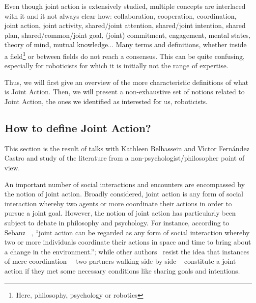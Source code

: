 \documentclass[a4paper,11pt,twoside]{StyleThese}
\begin{document}
Even though joint action is extensively studied, multiple concepts are interlaced with it and it not always clear how: collaboration, cooperation, coordination, joint action, joint activity, shared/joint attention, shared/joint intention, shared plan, shared/common/joint goal, (joint) commitment, engagement, mental states, theory of mind, mutual knowledge... Many terms and definitions, whether inside a field\footnote{Here, philosophy, psychology or robotics} or between fields do not reach a consensus. This can be quite confusing, especially for roboticists for which it is initially not the range of expertise. 

Thus, we will first give an overview of the more characteristic definitions of what is Joint Action. Then, we will present a non-exhaustive set of notions related to Joint Action, the ones we identified as interested for us, roboticists.

\subsection{How to define Joint Action?}\label{chap1:subsec:def_ja}

This section is the result of talks with Kathleen Belhassein and V{\'\i}ctor Fern{\'a}ndez Castro and study of the literature from a non-psychologist/philosopher point of view.

An important number of social interactions and encounters are encompassed by the notion of joint action. Broadly considered, joint action is any form of social interaction whereby two agents or more coordinate their actions in order to pursue a joint goal. However, the notion of joint action has particularly been subject to debate in philosophy and psychology. For instance, according to Sebanz \etal~\cite[p.~70]{sebanz_2006_joint}, ``joint action can be regarded as
any form of social interaction whereby two or more individuals coordinate their actions in space and time to bring about a change in the environment.''; while other authors~\cite{carpenter_2009_just, cohen_1991_teamwork, fiebich_2013_joint, tomasello_2005_understanding,pacherie_2012_agency} resist the idea that instances of mere coordination – \eg two partners walking side by side – constitute a joint action if they met some necessary conditions like sharing goals and intentions.
\end{document}
